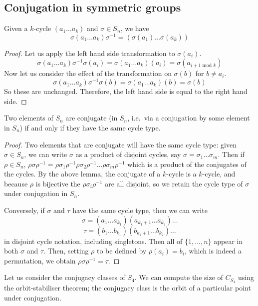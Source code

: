 \subsection{Conjugation in symmetric groups}
\begin{lemma}
	Given a \(k\)-cycle \((a_1\dots a_k)\) and \(\sigma \in S_n\), we have
	\[
		\sigma (a_1\dots a_k) \sigma^{-1} = (\sigma(a_1)\dots \sigma(a_k))
	\]
\end{lemma}
\begin{proof}
	Let us apply the left hand side transformation to \(\sigma(a_i)\).
	\[
		\sigma (a_1\dots a_k) \sigma^{-1} \sigma(a_i) = \sigma (a_1\dots a_k) (a_i) = \sigma(a_{i+1\text{ mod } k})
	\]
	Now let us consider the effect of the transformation on \(\sigma(b)\) for \(b \neq a_i\).
	\[
		\sigma (a_1\dots a_k) \sigma^{-1} \sigma(b) = \sigma (a_1\dots a_k) (b) = \sigma(b)
	\]
	So these are unchanged.
	Therefore, the left hand side is equal to the right hand side.
\end{proof}

\begin{proposition}
	Two elements of \(S_n\) are conjugate (in \(S_n\), i.e.\ via a conjugation by some element in \(S_n\)) if and only if they have the same cycle type.
\end{proposition}
\begin{proof}
	Two elements that are conjugate will have the same cycle type: given \(\sigma \in S_n\), we can write \(\sigma\) as a product of disjoint cycles, say \(\sigma = \sigma_1\dots\sigma_m\).
	Then if \(\rho \in S_n\), \(\rho \sigma \rho^{-1} = \rho \sigma_1 \rho^{-1} \rho \sigma_2 \rho^{-1} \dots \rho \sigma_m \rho^{-1}\) which is a product of the conjugates of the cycles.
	By the above lemma, the conjugate of a \(k\)-cycle is a \(k\)-cycle, and because \(\rho\) is bijective the \(\rho \sigma_i \rho^{-1}\) are all disjoint, so we retain the cycle type of \(\sigma\) under conjugation in \(S_n\).

	Conversely, if \(\sigma\) and \(\tau\) have the same cycle type, then we can write
	\[
		\sigma = (a_1\dots a_{k_1})(a_{k_1+1}\dots a_{k_2})\dots
	\]
	\[
		\tau = (b_1\dots b_{k_1})(b_{k_1+1}\dots b_{k_2})\dots
	\]
	in disjoint cycle notation, including singletons.
	Then all of \(\{ 1, \dots, n \}\) appear in both \(\sigma\) and \(\tau\).
	Then, setting \(\rho\) to be defined by \(\rho(a_i) = b_i\), which is indeed a permutation, we obtain \(\rho\sigma\rho^{-1}=\tau\).
\end{proof}
Let us consider the conjugacy classes of \(S_4\).
We can compute the size of \(C_{S_4}\) using the orbit-stabiliser theorem; the conjugacy class is the orbit of a particular point under conjugation.\medskip

